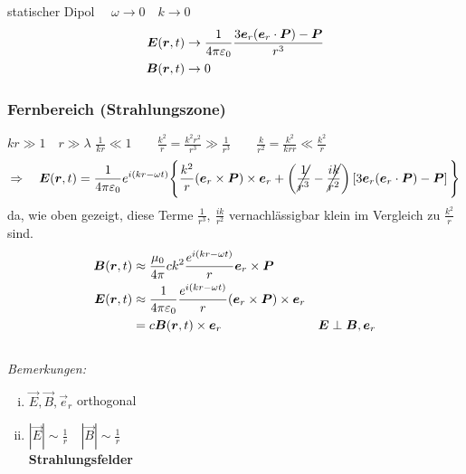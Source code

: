 statischer Dipol $ \quad \omega \to 0 \quad k \to 0 $
\begin{align*}
\bm{E}(\bm{r},t) &\rightarrow \frac{1}{4\pi\varepsilon_0} \frac{3 \bm{e}_r (\bm{e}_r \cdot \bm{P}) - \bm{P}}{r^3}\\
\bm{B}(\bm{r},t) &\rightarrow 0
\end{align*}
\subsubsection{Fernbereich (Strahlungszone)}
$ kr \gg 1 \quad r \gg \lambda $
%
%
%
%
%
%
$ \frac{1}{kr} \ll 1 \qquad \frac{k^2}{r} = \frac{k^2 r^2}{r^3} \gg \frac{1}{r^3} \qquad \frac{k}{r^2} = \frac{k^2}{kr r} \ll \frac{k^2}{r} $
\begin{equation*}
\Rightarrow \quad \bm{E}(\bm{r},t) = \frac{1}{4\pi\varepsilon_0} e^{i (kr - \omega t)} \Bigg\{ \frac{k^2}{r} (\bm{e}_r \times \bm{P}) \times \bm{e}_r + \left(\cancel{\frac{1}{r^3}} - \cancel{\frac{ik}{r^2}}\right) \left[3 \bm{e}_r (\bm{e}_r \cdot \bm{P}) - \bm{P}\right]\Bigg\}
\end{equation*}
da, wie oben gezeigt, diese Terme $ \frac{1}{r^3}, \ \frac{ik}{r^2} $ vernachlässigbar klein im Vergleich zu $ \frac{k^2}{r} $ sind.
\begin{align*}
\bm{B}(\bm{r},t) &\approx \frac{\mu_0}{4 \pi} c k^2 \frac{e^{i (kr - \omega t)}}{r} \bm{e}_r \times \bm{P} \\
\bm{E}(\bm{r},t) &\approx \frac{1}{4\pi\varepsilon_0} \frac{e^{i(kr - \omega t)}}{r} (\bm{e}_r \times \bm{P}) \times \bm{e}_r\\
&= c \bm{B}(\bm{r},t) \times \bm{e}_r \qquad \qquad &\bm{E} \perp \bm{B}, \bm{e}_r
\end{align*}
\\[10pt]
\emph{Bemerkungen:}
\begin{enumerate}[i)]
	\item $ \vec{E},\vec{B},\vec{e}_r $ orthogonal
	\item $ |\vec{E}| \sim \frac{1}{r} \quad |\vec{B}| \sim \frac{1}{r} $\\
	\textbf{Strahlungsfelder}\\
\end{enumerate}


